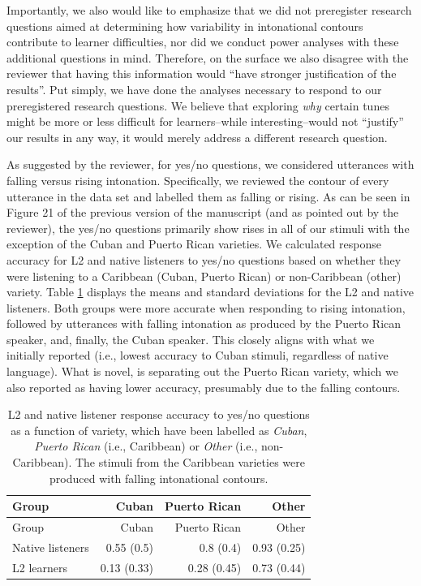 \documentclass[]{article}
\begin{document}
Importantly, we also would like to emphasize that we did not preregister research questions aimed at determining how variability in intonational contours contribute to learner difficulties, nor did we conduct power analyses with these additional questions in mind.
Therefore, on the surface we also disagree with the reviewer that having this information would ``have stronger justification of the results''.
Put simply, we have done the analyses necessary to respond to our preregistered research questions.
We believe that exploring \emph{why} certain tunes might be more or less difficult for learners--while interesting--would not ``justify'' our results in any way, it would merely address a different research question.

As suggested by the reviewer, for yes/no questions, we considered utterances with falling versus rising intonation.
Specifically, we reviewed the contour of every utterance in the data set and labelled them as falling or rising.
As can be seen in Figure 21 of the previous version of the manuscript (and as pointed out by the reviewer), the yes/no questions primarily show rises in all of our stimuli with the exception of the Cuban and Puerto Rican varieties.
We calculated response accuracy for L2 and native listeners to yes/no questions based on whether they were listening to a Caribbean (Cuban, Puerto Rican) or non-Caribbean (other) variety.
Table \ref{tab:table-learner-native-caribbean} displays the means and standard deviations for the L2 and native listeners.
Both groups were more accurate when responding to rising intonation, followed by utterances with falling intonation as produced by the Puerto Rican speaker, and, finally, the Cuban speaker.
This closely aligns with what we initially reported (i.e., lowest accuracy to Cuban stimuli, regardless of native language).
What is novel, is separating out the Puerto Rican variety, which we also reported as having lower accuracy, presumably due to the falling contours.

\begin{longtable}[]{@{}lrrr@{}}
\caption{\label{tab:table-learner-native-caribbean}L2 and native listener response accuracy to yes/no questions as a function of variety, which have been labelled as \emph{Cuban}, \emph{Puerto Rican} (i.e., Caribbean) or \emph{Other} (i.e., non-Caribbean). The stimuli from the Caribbean varieties were produced with falling intonational contours.}\tabularnewline
\toprule()
Group & Cuban & Puerto Rican & Other \\
\midrule()
\endfirsthead
\toprule()
Group & Cuban & Puerto Rican & Other \\
\midrule()
\endhead
Native listeners & 0.55 (0.5) & 0.8 (0.4) & 0.93 (0.25) \\
L2 learners & 0.13 (0.33) & 0.28 (0.45) & 0.73 (0.44) \\
\bottomrule()
\end{longtable}
\end{document}
